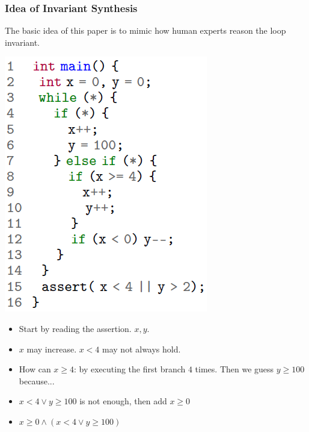 \documentclass[11pt]{beamer}
\begin{document}
\begin{frame}\frametitle{Idea of Invariant Synthesis}

The basic idea of this paper is to mimic how human experts reason the loop invariant.

\begin{example}
\begin{multicols}{2}
\includegraphics[scale = 0.45]{1.png}

\begin{itemize}
\item Start by reading the assertion. $x, y$.
\item $x$ may increase. $x < 4$ may not always hold.
\item How can $x \ge 4$: by executing the first branch $4$ times. Then we guess $y \ge 100$ because...
\item $x < 4 \vee y \ge 100$ is not enough, then add $x \ge 0$
\item $x \ge 0 \wedge (x < 4 \vee y \ge 100)$

\end{itemize}
\end{multicols}
\end{example}
\end{frame}
\end{document}
